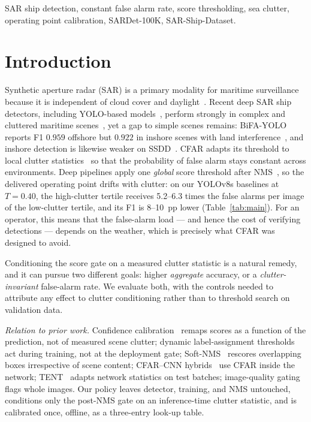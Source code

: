 \documentclass[journal]{IEEEtran}
\providecommand{\linelabel}[1]{}
\begin{document}
\begin{IEEEkeywords}
SAR ship detection, constant false alarm rate, score thresholding, sea
clutter, operating point calibration, SARDet-100K, SAR-Ship-Dataset.
\end{IEEEkeywords}

\section{Introduction}
\label{sec:intro}

Synthetic aperture radar (SAR) is a primary modality for maritime
surveillance because it is independent of cloud cover and
daylight~\cite{brusch2011}. \linelabel{ln:sota}Recent deep SAR ship
detectors, including YOLO-based models~\cite{yolov8,sun2021bifa}, perform
strongly in complex and cluttered maritime
scenes~\cite{li2022survey,sardet100k,sarship2019}, yet a gap to simple
scenes remains: BiFA-YOLO reports F1 $0.959$ offshore but $0.922$ in
inshore scenes with land interference~\cite{sun2021bifa}, and inshore
detection is likewise weaker on SSDD~\cite{zhang2021ssdd,zhang2022bslm}.\linelabel{ln:sotaend} CFAR adapts its threshold to
local clutter statistics~\cite{finn1968,goldstein1973} so that the
probability of false alarm stays constant across environments. Deep
pipelines apply one \emph{global} score threshold after
NMS~\cite{bodla2017}, so the delivered operating point drifts with
clutter: on our YOLOv8s baselines at $T{=}0.40$, the high-clutter tertile
\linelabel{ln:drift}receives 5.2--6.3 times the false alarms per image of the low-clutter
tertile, and its F1 is 8--10~pp lower (Table~\ref{tab:main}). For an
operator, this means that the false-alarm load --- and hence the cost of
verifying detections --- depends on the weather, which is precisely what
CFAR was designed to avoid.

Conditioning the score gate on a measured clutter statistic is a natural
remedy, and it can pursue two different goals: higher \emph{aggregate}
accuracy, or a \emph{clutter-invariant} false-alarm rate. We evaluate both,
with the controls needed to attribute any effect to clutter conditioning
rather than to threshold search on validation data.

\textit{Relation to prior work.}\linelabel{ln:prior}
Confidence calibration~\cite{guo2017calibration,kuppers2020detcal,munir2022calib}
remaps scores as a function of the prediction, not of measured scene
clutter; dynamic label-assignment thresholds~\cite{zhang2020dynamicrcnn}
act during training, not at the deployment gate; Soft-NMS~\cite{bodla2017}
rescores overlapping boxes irrespective of scene content; CFAR--CNN
hybrids~\cite{kang2017cfar} use CFAR inside the network;
TENT~\cite{wang2021tent} adapts network statistics on test batches;
image-quality gating~\cite{huang2024sarqa} flags whole images. Our policy
leaves detector, training, and NMS untouched, conditions only the
post-NMS gate on an inference-time clutter statistic, and is calibrated
once, offline, as a three-entry look-up table.\linelabel{ln:priorend}
\end{document}
